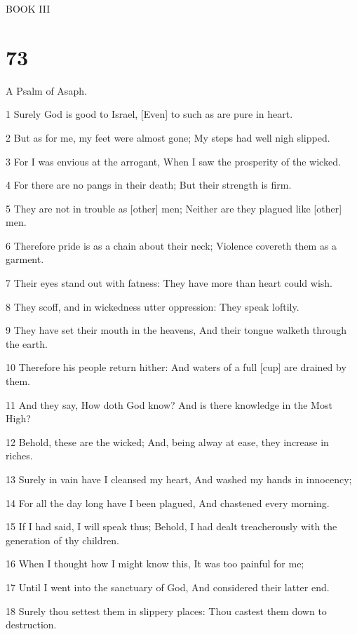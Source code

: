 \par BOOK III

\chapter{73}

\par A Psalm of Asaph.

\par 1 Surely God is good to Israel, [Even] to such as are pure in heart.
\par 2 But as for me, my feet were almost gone; My steps had well nigh slipped.
\par 3 For I was envious at the arrogant, When I saw the prosperity of the wicked.
\par 4 For there are no pangs in their death; But their strength is firm.
\par 5 They are not in trouble as [other] men; Neither are they plagued like [other] men.
\par 6 Therefore pride is as a chain about their neck; Violence covereth them as a garment.
\par 7 Their eyes stand out with fatness: They have more than heart could wish.
\par 8 They scoff, and in wickedness utter oppression: They speak loftily.
\par 9 They have set their mouth in the heavens, And their tongue walketh through the earth.
\par 10 Therefore his people return hither: And waters of a full [cup] are drained by them.
\par 11 And they say, How doth God know? And is there knowledge in the Most High?
\par 12 Behold, these are the wicked; And, being alway at ease, they increase in riches.
\par 13 Surely in vain have I cleansed my heart, And washed my hands in innocency;
\par 14 For all the day long have I been plagued, And chastened every morning.
\par 15 If I had said, I will speak thus; Behold, I had dealt treacherously with the generation of thy children.
\par 16 When I thought how I might know this, It was too painful for me;
\par 17 Until I went into the sanctuary of God, And considered their latter end.
\par 18 Surely thou settest them in slippery places: Thou castest them down to destruction.
